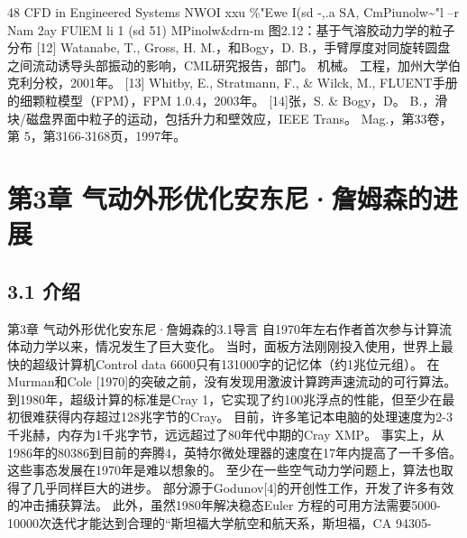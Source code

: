 \documentclass[UTF8,11pt,a4paper,openany,fontset=fandol]{ctexbook}
\begin{document}
48 CFD in Engineered Systems NWOI xxu \%"Ewe I(sd -,.a SA, CmPiunolw\textasciitilde{}"l --r Nam 2ay FUlEM li 1 (sd 51) MPinolw\&drn-m 图2.12：基于气溶胶动力学的粒子分布 [12] Watanabe, T., Gross, H. M.，和Bogy，D. B.，手臂厚度对同旋转圆盘之间流动诱导头部振动的影响，CML研究报告，部门。 机械。 工程，加州大学伯克利分校，2001年。 [13] Whitby, E., Stratmann, F., \& Wilck, M., FLUENT手册的细颗粒模型（FPM），FPM 1.0.4，2003年。 [14]张，S. \& Bogy，D。 B.，滑块/磁盘界面中粒子的运动，包括升力和壁效应，IEEE Trans。 Mag.，第33卷，第 5，第3166-3168页，1997年。

\clearpage
\chapter{第3章 气动外形优化安东尼·詹姆森的进展}
\section{3.1 介绍}
第3章 气动外形优化安东尼·詹姆森的3.1导言 自1970年左右作者首次参与计算流体动力学以来，情况发生了巨大变化。 当时，面板方法刚刚投入使用，世界上最快的超级计算机Control data 6600只有131000字的记忆体（约1兆位元组）。 在Murman和Cole [1970]的突破之前，没有发现用激波计算跨声速流动的可行算法。 到1980年，超级计算的标准是Cray 1，它实现了约100兆浮点的性能，但至少在最初很难获得内存超过128兆字节的Cray。 目前，许多笔记本电脑的处理速度为2-3千兆赫，内存为1千兆字节，远远超过了80年代中期的Cray XMP。 事实上，从1986年的80386到目前的奔腾4，英特尔微处理器的速度在17年内提高了一千多倍。 这些事态发展在1970年是难以想象的。 至少在一些空气动力学问题上，算法也取得了几乎同样巨大的进步。 部分源于Godunov[4]的开创性工作，开发了许多有效的冲击捕获算法。 此外，虽然1980年解决稳态Euler 方程的可用方法需要5000-10000次迭代才能达到合理的“斯坦福大学航空和航天系，斯坦福，CA 94305-
\end{document}
